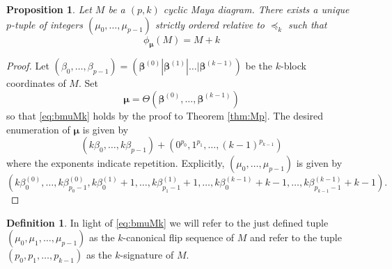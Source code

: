 \documentclass[10pt]{amsart}
\newtheorem{prop}[thm]{Proposition}
\theoremstyle{definition}
\newtheorem{definition}[thm]{Definition}
\numberwithin{equation}{section}
\numberwithin{figure}{section}
\newcommand{\bbeta}{{\boldsymbol{\beta}}}
\newcommand{\bmu}{{\boldsymbol{\mu}}}
\newcommand{\cZ}{\mathcal{Z}}
\begin{document}
\begin{prop}
  Let $M$ be a $(p,k)$ cyclic Maya diagram.  There exists a unique
  $p$-tuple of integers $(\mu_0,\ldots, \mu_{p-1})$ strictly ordered
  relative to $\preccurlyeq_k$ such that
  \begin{equation}
    \label{eq:bmuMk}
    \phi_\bmu(M) = M+k 
  \end{equation}
\end{prop}
\begin{proof}
  Let
  $(\beta_0,\ldots, \beta_{p-1}) =  (\bbeta^{(0)} | \bbeta^{(1)} | \ldots |   \bbeta^{(k-1)})$ be the $k$-block coordinates of $M$.
  Set \[ \bmu = \Theta\left(\bbeta^{(0)}, \ldots , \bbeta^{(k-1)}\right) \]
  so that \eqref{eq:bmuMk} holds by the proof to Theorem \ref{thm:Mp}.
  The desired enumeration of $\bmu$ is given by
  \[ (k \beta_0,\ldots, k \beta_{p-1}) + (0^{p_0}, 1^{p_1}, \ldots,
  (k-1)^{p_{k-1}}) \]
  where the exponents indicate repetition.  Explicitly,
  $(\mu_0,\ldots, \mu_{p-1})$ is given by
  \[ \left(k\beta^{(0)}_{0},\ldots, k\beta^{(0)}_{p_0-1}, k\beta^{(1)}_{0} + 1 ,\ldots,
  k\beta^{(1)}_{p_1-1} +1 , \ldots , k \beta^{(k-1)}_{0} + k-1, \ldots,
  k\beta^{(k-1)}_{p_{k-1}-1} + k-1 \right) .\]
\end{proof}
\begin{definition}
  In light of \eqref{eq:bmuMk} we will refer to the just defined tuple
  $(\mu_0,\mu_1,\ldots, \mu_{p-1})$ as the $k$-canonical flip sequence
  of $M$ and refer to the tuple $(p_0,p_1,\ldots, p_{k-1})$ as the
  $k$-signature of $M$.
\end{definition}
\end{document}
